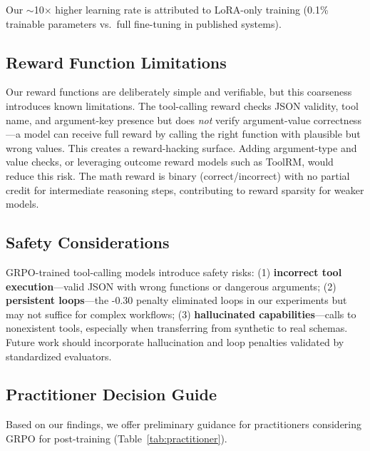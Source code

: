 \documentclass{article}
\begin{document}
Our $\sim$10$\times$ higher learning rate is attributed to LoRA-only training (0.1\% trainable parameters vs.\ full fine-tuning in published systems).

\subsection{Reward Function Limitations}

Our reward functions are deliberately simple and verifiable, but this coarseness introduces known limitations. The tool-calling reward checks JSON validity, tool name, and argument-key presence but does \emph{not} verify argument-value correctness---a model can receive full reward by calling the right function with plausible but wrong values. This creates a reward-hacking surface. Adding argument-type and value checks, or leveraging outcome reward models such as ToolRM, would reduce this risk. The math reward is binary (correct/incorrect) with no partial credit for intermediate reasoning steps, contributing to reward sparsity for weaker models.

\subsection{Safety Considerations}

GRPO-trained tool-calling models introduce safety risks: (1) \textbf{incorrect tool execution}---valid JSON with wrong functions or dangerous arguments; (2) \textbf{persistent loops}---the -0.30 penalty eliminated loops in our experiments but may not suffice for complex workflows; (3) \textbf{hallucinated capabilities}---calls to nonexistent tools, especially when transferring from synthetic to real schemas. Future work should incorporate hallucination and loop penalties validated by standardized evaluators.

\subsection{Practitioner Decision Guide}

Based on our findings, we offer preliminary guidance for practitioners considering GRPO for post-training (Table~\ref{tab:practitioner}).
\end{document}

